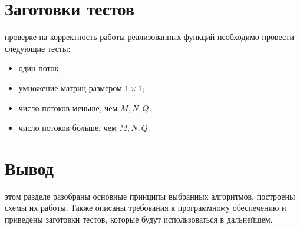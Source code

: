 \section{Заготовки тестов}
 проверке на корректность работы реализованных функций необходимо провести следующие тесты:
\begin{itemize}
	\item один поток;
	\item умножение матриц размером $1 \times 1$;
	\item число потоков меньше, чем $M, N, Q$;
	\item число потоков больше, чем $M, N, Q$.
\end{itemize}

\section*{Вывод}
 этом разделе разобраны основные принципы выбранных алгоритмов, построены схемы их работы. Также описаны требования к программному обеспечению и приведены заготовки тестов, которые будут использоваться в дальнейшем.